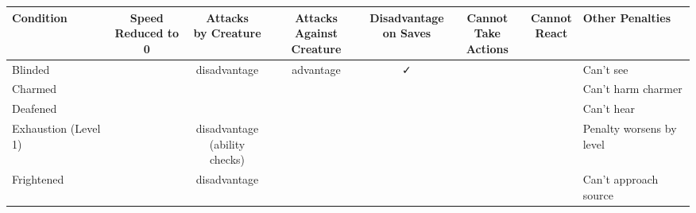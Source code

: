 \documentclass[letterpaper,landscape,12pt]{article}
\begin{document}
\renewcommand{\arraystretch}{1.5}
\setlength{\tabcolsep}{3pt} %

\begin{table}[h!]
\centering
\begin{tabular}{@{}l c c c c c c l@{}}
\toprule
\textbf{Condition} & \parbox[t]{1.5cm}{\centering Speed \\ Reduced to 0} & \parbox[t]{2.5cm}{\centering Attacks \\ by Creature} & \parbox[t]{2.5cm}{\centering Attacks \\ Against Creature} & \parbox[t]{1.5cm}{\centering Disadvantage \\ on Saves} & \parbox[t]{1.5cm}{\centering Cannot \\ Take Actions} & \parbox[t]{1.5cm}{\centering Cannot \\ React} & \textbf{Other Penalties} \\ \midrule
Blinded            &                                              & \parbox{2.5cm}{\centering disadvantage}          & \parbox{2.5cm}{\centering advantage}           & ✓                                   &                                        &                                     & Can't see \\ 
Charmed            &                                              &                                                &                                              &                                     &                                        &                                     & Can't harm charmer \\ 
Deafened           &                                              &                                                &                                              &                                     &                                        &                                     & Can't hear \\ 
Exhaustion (Level 1) &                                            & \parbox{2.5cm}{\centering disadvantage \\ (ability checks)} &                                  &                                     &                                        &                                     & Penalty worsens by level \\ 
Frightened         &                                              & \parbox{2.5cm}{\centering disadvantage}          &                                              &                                     &                                        &                                     & Can't approach source \\ 

\end{tabular}
\end{table}
\end{document}
